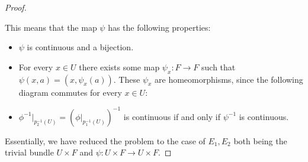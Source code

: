 \begin{proof}
\vspace*{-1em}
\begin{center}
\end{center}
This means that the map $\psi$ has the following properties:
\begin{itemize}
\item $\psi$ is continuous and a bijection.
\item For every $x\in U$ there exists some map $\psi_x:F\to F$ such that $\psi(x,a)=(x,\psi_x(a))$. These $\psi_x$ are homeomorphisms, since the following diagram commutes for every $x\in U$:
\vspace*{-1em}
\begin{center}
\end{center}
\item $\phi^{-1}|_{p_2^{-1}(U)}=(\phi|_{p_1^{-1}(U)})^{-1}$ is continuous if and only if $\psi^{-1}$ is continuous.
\end{itemize}
Essentially, we have reduced the problem to the case of $E_1,E_2$ both being the trivial bundle $U\times F$ and $\psi:U\times F\to U\times F$.


\end{proof}
